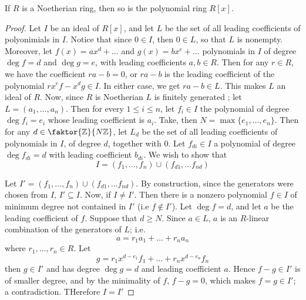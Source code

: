\begin{theorem}\label{1.1.3}
    If $R$ is a Noetherian ring, then so is the polynomial ring $R[x]$.
\end{theorem}
\begin{proof}
    Let $I$ be an ideal of  $R[x]$, and let $L$ be the set of all leading
    coefficients of polyonimials in $I$. Notice that since  $0 \in I$, then  $0
    \in L$, so that $L$ is nonempty. Moreover, let $f(x)=ax^d+\dots$ and
    $g(x)=bx^e+\dots$ polynomials in $I$ of degree  $\deg{f}=d$ and $\deg{g}=e$,
    with leading coefficients $a, b \in R$. Then for any  $r \in R$, we have the
    coefficient  $ra-b=0$, or  $ra-b$ is the leading coefficient of the
    polynomial  $rx^ef-x^dg \in I$. In either case, we get  $ra-b \in L$. This
    makes  $L$ an ideal of  $R$. Now, since  $R$ is Noetherian  $L$ is finitely
    generated ; let $L=(a_1, \dots, a_n)$. Then for every $1 \leq  i \leq n$,
    let  $f_i \in I$ the polynomial of degree  $\deg{f_i}=e_i$ whose leading
    coefficient is $a_i$. Take, then  $N=\max{\{e_1, \dots, e_n\}}$. Then for
    any $d \in \faktor{\Z}{N\Z}$, let $L_d$ be the set of all leading
    coefficients of polynomials in  $I$, of degree $d$, together with $0$. Let
    $f_{di} \in I$ a polynomial of degree $\deg{f_{di}}=d$ with leading
    coefficient $b_{di}$. We wish to show that
    \begin{equation*}
        I=(f_1, \dots, f_n) \cup (f_{d1}, \dots f_{nd})
    \end{equation*}

    Let $I'=(f_1, \dots, f_n) \cup (f_{d1}, \dots f_{nd})$. By construction,
    since the generators were chosen from $I$,  $I' \subseteq I$. Now, if
    $I \neq I'$. Then there is a nonzero polynomial $f \in I$ of minimum degree
     not contained in $I'$  (i.e $f \notin I'$). Let $\deg{f}=d$, and let $a$ be
     the leading coefficient of  $f$. Suppose that  $d \geq N$. Since  $a \in
     L$, $a$ is an  $R$-linear combination of the generators of  $L$; i.e.
     \begin{equation*}
         a=r_1a_1+\dots+r_na_n
     \end{equation*}
     where $r_1, \dots, r_n \in R$. Let
     \begin{equation*}
        g=r_1x^{d-e_1}f_1+\dots+r_nx^{d-e_n}f_n
     \end{equation*}
     then $g \in I'$ and has degree $\deg{g}=d$ and leading coefficient $a$.
     Hence  $f-g \in I'$ is of smaller degree, and by the minimality of  $f$,
     $f-g=0$, which makes  $f=g \in I'$; a contradiction. THerefore $I=I'$


\end{proof}
